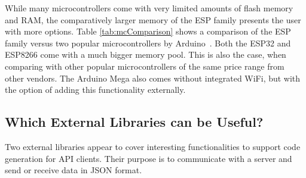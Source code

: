 \documentclass[manuscript,screen]{acmart}
\begin{document}
While many microcontrollers come with very limited amounts of flash memory and RAM, the comparatively larger memory of the ESP family presents the user with more options. 
%
Table \ref{tab:mcComparison} shows a comparison of the ESP family versus two popular  microcontrollers by Arduino~\cite{ArduinoMegaSpecs, ArduinoUnoSpecs}. Both the ESP32 and ESP8266 come with a much bigger memory pool. This is also the case, when comparing with other popular microcontrollers of the same price range from other vendors. The Arduino Mega also comes without integrated WiFi, but with the option of adding this functionality externally. 


\begin{table}[!b]
\caption{Comparison of popular microcontrollers}
\label{tab:mcComparison}
\end{table}




\subsection{Which External Libraries can be Useful?}
Two external libraries appear to cover interesting functionalities to support code generation for API clients. Their purpose is to communicate with a server and send or receive data in JSON format. 
\end{document}
